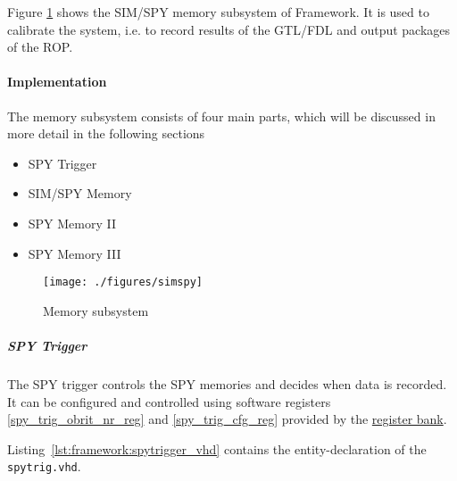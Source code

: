 Figure \ref{fig_simspy} shows the SIM/SPY memory subsystem of Framework.
It is used to calibrate the system, i.e. to record results of the GTL/FDL and output packages of the ROP.

\paragraph{Implementation}\label{sec:framework:sim_spy_impl}
The memory subsystem consists of four main parts, which will be discussed in more detail in the following sections

\begin{itemize}
\item SPY Trigger
\item SIM/SPY Memory
\item SPY Memory II
\item SPY Memory III
\end{itemize}

\begin{figure}[h]
\texttt{[image: ./figures/simspy]}
\caption{Memory subsystem}
\label{fig_simspy}
\end{figure}

\subparagraph{SPY Trigger}\label{sec:framework:spy_trigger}
The SPY trigger controls the SPY memories and decides when data is recorded. It can be configured and controlled using
software registers \ref{spy_trig_obrit_nr_reg} and \ref{spy_trig_cfg_reg} provided by the \hyperref[sec_rb]{register bank}.

Listing~\ref{lst:framework:spytrigger_vhd} contains the entity-declaration of the \texttt{spytrig.vhd}.\\



